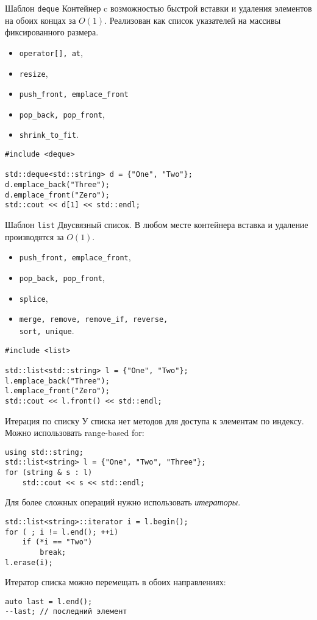 \documentclass{beamer}
\begin{document}
\begin{frame}[fragile]{Шаблон {\tt deque}}
Контейнер c возможностью быстрой вставки и удаления элементов на
обоих концах за $O(1)$. Реализован как список указателей на массивы
фиксированного размера.
\begin{itemize}
    \item {\tt operator[], at},
    \item {\tt resize},
    \item {\tt push\_front, emplace\_front}
    \item \texttt{pop\_back, pop\_front},
    \item \texttt{shrink\_to\_fit}.
\end{itemize}
\begin{lstlisting}
#include <deque>

std::deque<std::string> d = {"One", "Two"};
d.emplace_back("Three");
d.emplace_front("Zero");
std::cout << d[1] << std::endl;
\end{lstlisting}

\end{frame}

\begin{frame}[fragile]{Шаблон {\tt list}}
Двусвязный список. В любом месте контейнера 
вставка и удаление производятся за $O(1)$.
\begin{itemize}к
    \item {\tt push\_front, emplace\_front},
    \item \texttt{pop\_back, pop\_front},
    \item \texttt{splice},
    \item {\tt merge, remove, remove\_if, reverse, \\sort, unique}.
\end{itemize}
\begin{lstlisting}
#include <list>

std::list<std::string> l = {"One", "Two"};
l.emplace_back("Three");
l.emplace_front("Zero");
std::cout << l.front() << std::endl;
\end{lstlisting}
\end{frame}

\begin{frame}[fragile]{Итерация по списку}
У списка нет методов для доступа к элементам по индексу.\\
Можно использовать range-based for:
\begin{lstlisting}
using std::string;
std::list<string> l = {"One", "Two", "Three"};
for (string & s : l)
    std::cout << s << std::endl;
\end{lstlisting}
Для более сложных операций нужно использовать \emph{итераторы}.
\begin{lstlisting}
std::list<string>::iterator i = l.begin();
for ( ; i != l.end(); ++i)
    if (*i == "Two")
        break;
l.erase(i);
\end{lstlisting}

Итератор списка можно перемещать в обоих направлениях:
\begin{lstlisting}    
auto last = l.end();
--last; // последний элемент
\end{lstlisting}
\end{frame}
\end{document}
